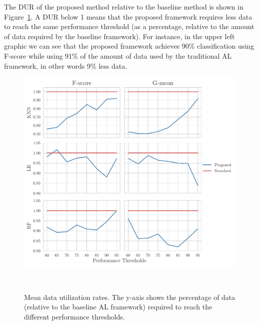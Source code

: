 
The DUR of the proposed method relative to the baseline method is shown in
Figure~\ref{fig:dur_al_generator}. A DUR below 1 means that the proposed framework requires
less data to reach the same performance threshold (as a percentage, relative
to the amount of data required by the baseline framework). For instance, in the
upper left graphic we can see that the proposed framework achieves 90\%
classification using F-score while using 91\% of the amount of data used by the
traditional AL framework, in other words 9\% less data.

\begin{figure}
	\centering
	\includegraphics[width=.75\linewidth]{data_utilization_rate}
    \caption[Mean data utilization rates.]{%
        Mean data utilization rates. The y-axis shows the percentage of data
        (relative to the baseline AL framework) required to reach the
        different performance thresholds.
    }~\label{fig:dur_al_generator}
\end{figure}

